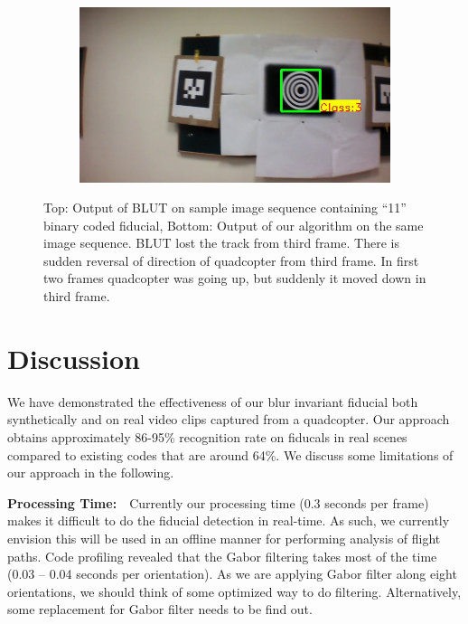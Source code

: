 \documentclass[runningheads]{llncs}
\begin{document}
\begin{figure}
\begin{subfigure}[b]{.19\textwidth}
\end{subfigure}
\begin{subfigure}[b]{.19\textwidth}
\includegraphics[width=\linewidth]{BLUT_input_11/output6.jpg}
\end{subfigure}
\caption{Top: Output of BLUT\cite{Wu:2011} on sample image sequence containing
``11'' binary coded fiducial, Bottom: Output of our algorithm on the same image
sequence. BLUT lost the track from third frame. There is sudden reversal of
direction of quadcopter from third frame. In first two frames quadcopter was
going up, but suddenly it moved down in third frame.}
\label{fig:BLUT_compare_11}
\end{figure}

\section{Discussion}\label{sec:discussion}

We have demonstrated the effectiveness of our blur invariant fiducial both
synthetically and on real video clips captured from a quadcopter.   Our approach obtains
approximately 86-95\% recognition rate on fiducals in real scenes compared to existing codes
that are around 64\%.  We discuss some limitations of our approach in the following. 

\noindent\textbf{Processing Time:}~~Currently our processing time (0.3 seconds
per frame) makes it difficult to do the fiducial detection in real-time.  As such, we currently
envision this will be used in an offline manner for performing analysis of flight paths.
Code profiling revealed that the Gabor filtering takes most of the time (0.03
-- 0.04 seconds per orientation). As we are applying Gabor filter along eight
orientations, we should think of some optimized way to do filtering.
Alternatively, some replacement for Gabor filter needs to be find out.
\end{document}

